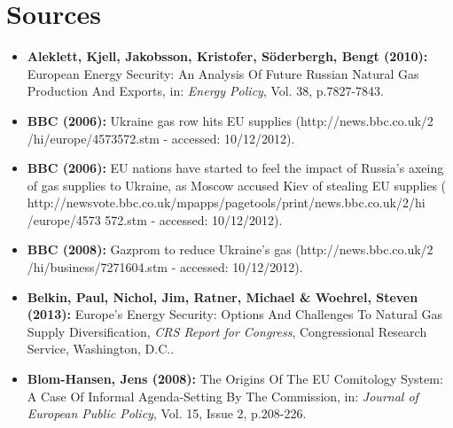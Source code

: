 \documentclass[11pt,a4paper,english]{scrreprt}
\begin{document}


\chapter{Sources}

  \begin{itemize}
	
	\sffamily
	
	
	\item [\Rectsteel] \textbf{Aleklett, Kjell, Jakobsson, Kristofer,
S\"oderbergh, Bengt (2010):} European Energy Security: An Analysis Of Future
Russian Natural Gas Production And Exports, in: \textsl{Energy Policy}, Vol.
38, p.7827-7843.
	


\item [\Rectsteel] \textbf{BBC (2006):} Ukraine gas row hits EU supplies 
(\textcolor{dunkelgrau.80}{http://news.bbc.co.uk/2\\
/hi/europe/4573572.stm} - accessed: 10/12/2012).	


\item [\Rectsteel] \textbf{BBC (2006):} EU nations have started to feel the
impact of Russia's axeing of gas supplies to Ukraine, as Moscow accused Kiev of
stealing EU supplies (\textcolor{dunkelgrau.80}{
http://newsvote.bbc.co.uk/mpapps/pagetools/print/news.bbc.co.uk/2/hi \\
/europe/4573 572.stm} - accessed: 10/12/2012).
	


\item [\Rectsteel] \textbf{BBC (2008):} Gazprom to reduce Ukraine's gas 
(\textcolor{dunkelgrau.80}{http://news.bbc.co.uk/2\\
/hi/business/7271604.stm} - accessed: 10/12/2012).



	\item [\Rectsteel] \textbf{Belkin, Paul, Nichol, Jim, Ratner,
Michael \& Woehrel, Steven (2013):} Europe's Energy Security: Options And
Challenges To Natural Gas Supply Diversification, \textsl{CRS Report for
Congress}, Congressional Research Service, Washington, D.C..


	
	\item [\Rectsteel] \textbf{Blom-Hansen, Jens (2008):} The Origins Of
The EU Comitology System: A Case Of Informal Agenda-Setting By The Commission,
in: \textsl{Journal of European Public Policy}, Vol. 15, Issue 2, p.208-226.




\end{itemize}
\end{document}
